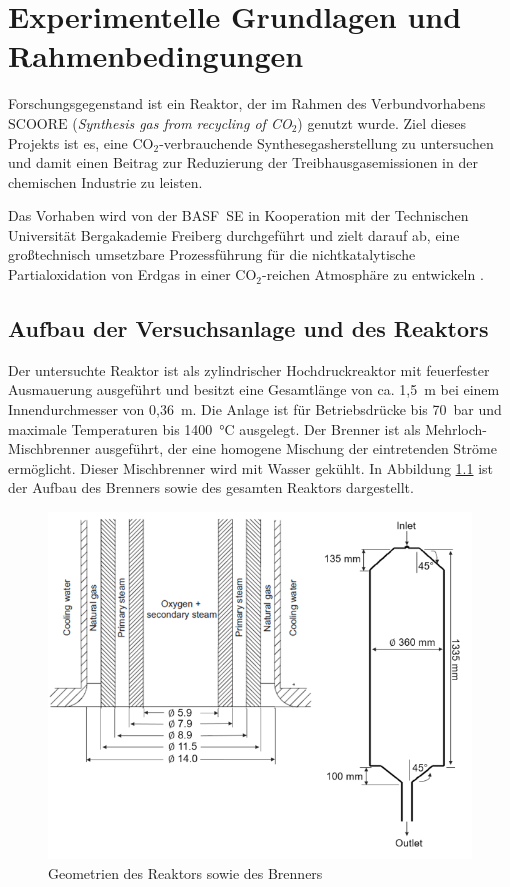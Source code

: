 \chapter{Experimentelle Grundlagen und Rahmenbedingungen}
    Forschungsgegenstand ist ein Reaktor, der im Rahmen des Verbundvorhabens $\mbox{SCOORE}$ (\textit{Synthesis gas from recycling of CO$_2$}) genutzt wurde. Ziel dieses Projekts ist es, eine CO$_2$-verbrauchende Synthesegasherstellung zu untersuchen und damit einen Beitrag zur Reduzierung der Treibhausgasemissionen in der chemischen Industrie zu leisten. 

    Das Vorhaben wird von der BASF~SE in Kooperation mit der Technischen Universität Bergakademie Freiberg durchgeführt und zielt darauf ab, eine großtechnisch umsetzbare Prozessführung für die nichtkatalytische Partialoxidation von Erdgas in einer CO$_2$-reichen Atmosphäre zu entwickeln \cite{Scoore_Enargus}.  
    \section{Aufbau der Versuchsanlage und des Reaktors}
        Der untersuchte Reaktor ist als zylindrischer Hochdruckreaktor mit feuerfester Ausmauerung ausgeführt und besitzt eine Gesamtlänge von ca. 1,5~m bei einem Innendurchmesser von 0,36~m. Die Anlage ist für Betriebsdrücke bis 70~bar und maximale Temperaturen bis 1400~°C ausgelegt. Der Brenner ist als Mehrloch-Mischbrenner ausgeführt, der eine homogene Mischung der eintretenden Ströme ermöglicht. Dieser Mischbrenner wird mit Wasser gekühlt. In Abbildung \ref{fig:reaktorgeometrie} ist der Aufbau des Brenners sowie des gesamten Reaktors dargestellt. 
        \begin{figure}[H]
            \centering
            \includegraphics[width=0.6\linewidth]{img/sonstiges/Reaktorgeometrien.png}
            \caption{Geometrien des Reaktors sowie des Brenners}
            \label{fig:reaktorgeometrie}
        \end{figure}

